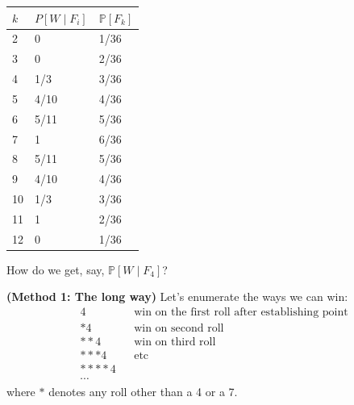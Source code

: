 \documentclass[10pt]{article}
\theoremstyle{definition}
\newcommand{\1}[1]{\textbf{1}_{\left[#1\right]}} %
\def\P{\mathbb{P}} %
\begin{document}
\begin{table}[htbp]
  \centering
  \begin{tabular}{l|l|l}
    \textit{\textbf{$k$}} & \textbf{$P[W\mid F_i]$} & \textbf{$\P[F_k]$} \\ \hline
    2                     & 0                       & 1/36               \\
    3                     & 0                       & 2/36               \\
    4                     & 1/3                     & 3/36               \\
    5                     & 4/10                    & 4/36               \\
    6                     & 5/11                    & 5/36               \\
    7                     & 1                       & 6/36               \\
    8                     & 5/11                    & 5/36               \\
    9                     & 4/10                    & 4/36               \\
    10                    & 1/3                     & 3/36               \\
    11                    & 1                       & 2/36               \\
    12                    & 0                       & 1/36              
  \end{tabular}
\end{table}
How do we get, say, $\P\left[W \mid F_{4} \right]$?

\textbf{(Method 1: The long way)} Let's enumerate the ways we can win:
\begin{align*}
  &4 &&\text{win on the first roll after establishing point}\\ 
  &*4 &&\text{win on second roll}\\
  &**4 &&\text{win on third roll }\\
  &***4 &&\text{etc }\\
  &****4\\
  &\cdots
\end{align*}
where $*$ denotes any roll other than a 4 or a 7.
\end{document}
